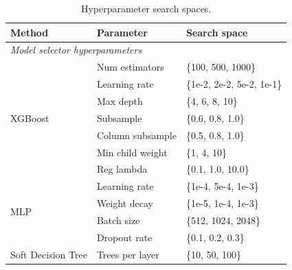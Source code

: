 \begin{table}[t]
    \centering
    \caption{Hyperparameter search spaces. 
    }
    \label{tab:hp_spaces} \small
    \begin{tabular}{@{}lll@{}}
        \toprule \textbf{Method}                                               & \textbf{Parameter}  & \textbf{Search space}      \\
        \midrule \multicolumn{3}{l}{\textit{Model selector hyperparameters}}    \\
        \midrule \multirow{7}{*}{XGBoost}                                      & Num estimators      & \{100, 500, 1000\}         \\
                                                                               & Learning rate       & \{1e-2, 2e-2, 5e-2, 1e-1\} \\
                                                                               & Max depth           & \{4, 6, 8, 10\}            \\
                                                                               & Subsample           & \{0.6, 0.8, 1.0\}          \\
                                                                               & Column subsample    & \{0.5, 0.8, 1.0\}          \\
                                                                               & Min child weight    & \{1, 4, 10\}               \\
                                                                               & Reg lambda          & \{0.1, 1.0, 10.0\}         \\
        \midrule \multirow{4}{*}{MLP}                                          & Learning rate       & \{1e-4, 5e-4, 1e-3\}       \\
                                                                               & Weight decay        & \{1e-5, 1e-4, 1e-3\}       \\
                                                                               & Batch size          & \{512, 1024, 2048\}        \\
                                                                               & Dropout rate        & \{0.1, 0.2, 0.3\}          \\
        \midrule \multirow{4}{*}{Soft Decision Tree}                           & Trees per layer     & \{10, 50, 100\}            \\

\end{tabular}
\end{table}
